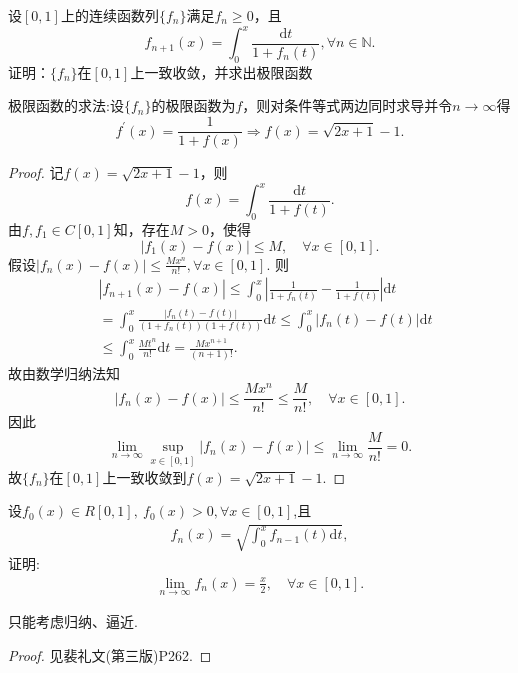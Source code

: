 \documentclass[../../main.tex]{subfiles}%
\begin{document}
\begin{example}
设\( [0,1] \)上的连续函数列\( \{f_n\} \)满足\( f_n \geqslant 0 \)，且
\[
f_{n+1}(x) = \int_0^x \frac{\mathrm{d}t}{1 + f_n(t)}, \forall n \in \mathbb{N}.
\]
证明：\( \{f_n\} \)在\( [0,1] \)上一致收敛，并求出极限函数
\end{example}
\begin{note}
极限函数的求法:设\( \{f_n\} \)的极限函数为\( f \)，则对条件等式两边同时求导并令\( n\rightarrow \infty \)得
\[
f^\prime(x) = \frac{1}{1 + f(x)} \Longrightarrow f(x) = \sqrt{2x + 1} - 1.
\]
\end{note}
\begin{proof}

记\( f(x) = \sqrt{2x + 1} - 1 \)，则
\[
f(x) = \int_0^x{\frac{\mathrm{d}t}{1 + f(t)}}.
\]
由\( f,f_1 \in C[0,1] \)知，存在\( M > 0 \)，使得
\[
|f_1(x) - f(x)| \leqslant M,\quad \forall x \in [0,1].
\]
假设\( |f_n(x) - f(x)| \leqslant \frac{Mx^{n}}{n!},\forall x \in [0,1] \). 则
\begin{align*}
&|f_{n + 1}(x) - f(x)| \leqslant \int_0^x{\left| \frac{1}{1 + f_n(t)} - \frac{1}{1 + f(t)} \right|}\mathrm{d}t \\
&= \int_0^x{\frac{|f_n(t) - f(t)|}{(1 + f_n(t))(1 + f(t))}\mathrm{d}t} \leqslant \int_0^x{|f_n(t) - f(t)|\mathrm{d}t} \\
&\leqslant \int_0^x{\frac{Mt^{n}}{n!}\mathrm{d}t} = \frac{Mx^{n+1}}{(n + 1)!}.
\end{align*}
故由数学归纳法知
\[
|f_n(x) - f(x)| \leqslant \frac{Mx^{n}}{n!} \leqslant \frac{M}{n!},\quad \forall x \in [0,1].
\]
因此
\[
\lim_{n \to \infty} \sup_{x \in [0,1]} |f_n(x) - f(x)| \leqslant \lim_{n \to \infty} \frac{M}{n!} = 0.
\]
故\( \{f_n\} \)在\( [0,1] \)上一致收敛到\( f(x) = \sqrt{2x + 1} - 1 \).

\end{proof}

\begin{example}
设$f_0(x)\in R[0,1],\ f_0(x)>0,\forall x\in [0,1]$,且
\begin{align*}
f_n(x)=\sqrt{\int_0^x f_{n-1}(t)\mathrm{d}t},
\end{align*}
证明:
\begin{align*}
\lim\limits_{n\to\infty}f_n(x)=\frac{x}{2},\quad \forall x\in [0,1].
\end{align*}
\end{example}
\begin{remark}
只能考虑归纳、逼近.
\end{remark}
\begin{proof}

见裴礼文(第三版)P262.

\end{proof}
\end{document}
